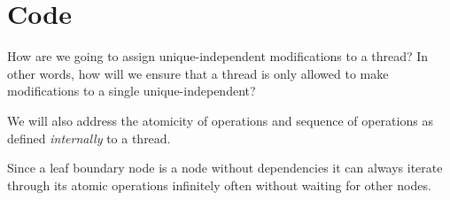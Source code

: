 \section{Code}

How are we going to assign unique-independent modifications to a thread? In other words, how will we ensure that a thread is only allowed to make modifications to a single unique-independent?

We will also address the atomicity of operations and sequence of operations as defined \textit{internally} to a thread.

Since a leaf boundary node is a node without dependencies it can always iterate through its atomic operations infinitely often without waiting for other nodes.